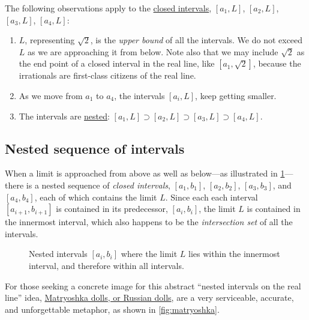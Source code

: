 \documentclass[
  a4paper,
]{article}
\begin{document}
The following observations apply to the
\href{https://mathworld.wolfram.com/ClosedInterval.html}{closed
intervals}, \([a_1, L]\), \([a_2, L]\), \([a_3, L]\), \([a_4, L]\):

\begin{enumerate}
\def\labelenumi{\alph{enumi}.}
\item
  \(L\), representing \(\sqrt{2}\), is the \emph{upper bound} of all the
  intervals. We do not exceed \(L\) as we are approaching it from below.
  Note also that we may include \(\sqrt{2}\) as the end point of a
  closed interval in the real line, like \([a_1, \sqrt{2}]\), because
  the irrationals are first-class citizens of the real line.
\item
  As we move from \(a_1\) to \(a_4\), the intervals \([a_i, L]\), keep
  getting smaller.
\item
  The intervals are
  \href{https://en.wikipedia.org/wiki/Nested_intervals}{nested}:
  \([a_1, L] \supset [a_2, L] \supset [a_3, L] \supset [a_4, L]\).
\end{enumerate}

\subsection{Nested sequence of
intervals}\label{nested-sequence-of-intervals}

When a limit is approached from above as well as below---as illustrated
in \cref{fig:nested-bilateral}---there is a nested sequence of
\emph{closed intervals}, \([a_1, b_1]\), \([a_2, b_2]\), \([a_3, b_3]\),
and \([a_4, b_4]\), each of which contains the limit \(L\). Since each
each interval \([a_{i+1}, b_{i+1}]\) is contained in its predecessor,
\([a_{i}, b_{i}]\), the limit \(L\) is contained in the innermost
interval, which also happens to be the \emph{intersection set} of all
the intervals.

\begin{figure}
\centering

\caption{Nested intervals \([a_i, b_i]\) where the limit \(L\) lies
within the innermost interval, and therefore within all
intervals.}\label{fig:nested-bilateral}
\end{figure}

For those seeking a concrete image for this abstract ``nested intervals
on the real line'' idea,
\href{https://en.wikipedia.org/wiki/Matryoshka_doll}{Matryoshka dolls,
or Russian dolls}, are a very serviceable, accurate, and unforgettable
metaphor, as shown in \cref{fig:matryoshka}.
\end{document}
